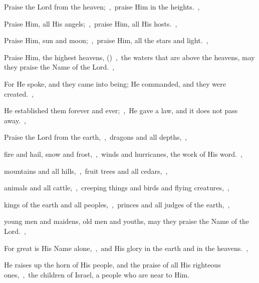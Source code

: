 \documentclass[12pt,twoside,a5paper]{article}
\begin{document}
\begin{normalparskip}
  Praise the Lord from the heaven;~\sep\ praise Him in the heights.~\sep


  Praise Him, all His angels;~\sep\ praise Him, all His hosts.~\sep

  Praise Him, sun and moon;~\sep\ praise Him, all the stars and light.~\sep

  Praise Him, the highest heavens, ()~\sep\ the waters that are above the heavens, may they praise the Name of the Lord.~\sep

  For He spoke, and they came into being; He commanded, and they were created.~\sep

  He established them forever and ever;~\sep\ He gave a law, and it does not pass away.~\sep

  Praise the Lord from the earth,~\sep\ dragons and all depths,~\sep

  fire and hail, snow and frost,~\sep\ winds and hurricanes, the work of His word.~\sep

  mountains and all hills,~\sep\ fruit trees and all cedars,~\sep

  animals and all cattle,~\sep\ creeping things and birds and flying creatures,~\sep

  kings of the earth and all peoples,~\sep\ princes and all judges of the earth,~\sep

  young men and maidens, old men and youths, may they praise the Name of the Lord.~\sep

  For great is His Name alone,~\sep\ and His glory in the earth and in the heavens.~\sep

  He raises up the horn of His people, and the praise of all His righteous ones,~\sep\ the children of Israel, a people who are near to Him.
\end{normalparskip}

\end{document}
